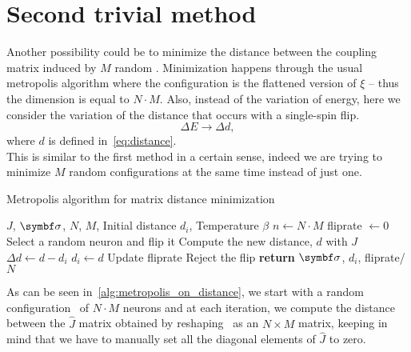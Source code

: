 \documentclass[\rootdir/main.tex]{subfiles}
\begin{document}
\section{Second trivial method}
Another possibility could be to minimize the distance between the coupling matrix induced by $M$ random \bxi. Minimization happens through the usual metropolis algorithm where the configuration is the flattened version of $\xi$ -- thus the dimension is equal to $N \cdot M$. Also, instead of the variation of energy, here we consider the variation of the distance that occurs with a single-spin flip.
\begin{equation}
    \Delta E \rightarrow \Delta d,
\end{equation}
where $d$ is defined in~\cref{eq:distance}.\\
This is similar to the first method in a certain sense, indeed we are trying to minimize $M$ random configurations at the same time instead of just one.
\begin{algorithm}
\caption{Metropolis algorithm for matrix distance minimization}
\label{alg:metropolis_on_distance}
\begin{algorithmic}[1]
    \Require $J$, $\bsigma$, $N$, $M$, Initial distance $d_i$, Temperature $\beta$
    \State $n \gets N \cdot M$
    \State fliprate $\gets 0$ 
        \State Select a random neuron and flip it
        \State Compute the new distance, $d$ with $J$ 
        \State $\Delta d \gets d - d_i$ 
            \State $d_i \gets d$
            \State Update fliprate 
        \Else
            \State Reject the flip
        \EndIf
    \EndFor
    \State \textbf{return} $\bsigma$, $d_i$, fliprate/$N$
\end{algorithmic}
\end{algorithm}
As can be seen in~\cref{alg:metropolis_on_distance}, we start with a random configuration \bsigma\ of $N \cdot M$ neurons and at each iteration, we compute the distance between the $\hat{J}$ matrix obtained by reshaping \bsigma\ as an $N \times M$ matrix, keeping in mind that we have to manually set all the diagonal elements of $\hat{J}$ to zero.
\end{document}
